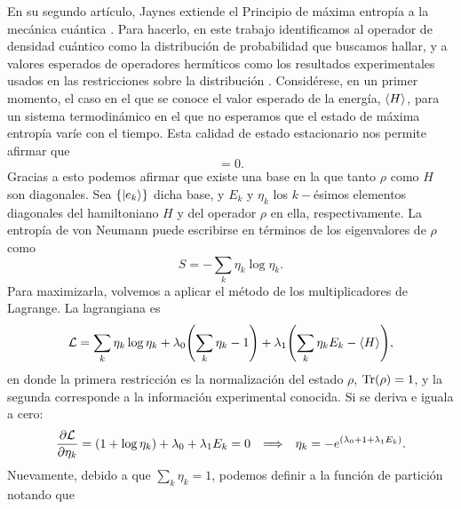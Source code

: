 En su segundo artículo, Jaynes extiende el Principio de máxima entropía a la mecánica cuántica \cite{JaynesII}. Para hacerlo, en este trabajo identificamos al operador de densidad cuántico como la distribución de probabilidad que buscamos hallar, y a valores esperados de operadores hermíticos como los resultados experimentales usados en las restricciones sobre la distribución  . Considérese, en un primer momento, el caso en el que se conoce el valor esperado de la energía, $\expval{H}$, para un sistema termodinámico en el que no esperamos que el estado de máxima entropía varíe con el tiempo. Esta calidad de estado estacionario nos permite afirmar que
\begin{equation*}
    [\rho,H]=0.
\end{equation*}
Gracias a esto podemos afirmar que existe una base en la que tanto $\rho$ como $H$ son diagonales. Sea $\{\ket{e_{k}}\}$ dicha base, y $E_{k}$ y $\eta_{k}$ los $k-$ésimos elementos diagonales del hamiltoniano $H$ y del operador $\rho$ en ella, respectivamente. La entropía de von Neumann puede escribirse en términos de los eigenvalores de $\rho$ como
\begin{equation*}
    S=-\sum_{k}\eta_{k}\log{\eta_{k}}.
\end{equation*}
Para maximizarla, volvemos a aplicar el método de los multiplicadores de Lagrange. La lagrangiana es
\begin{equation*}
    \mathcal{L}=\sum_{k}\eta_{k}\log{\eta_{k}}+\lambda_{0}\qty(\sum_{k}\eta_{k}-1)+\lambda_{1}\qty(\sum_{k}\eta_{k}E_{k}-\expval{H}),
\end{equation*}
en donde la primera restricción es la normalización del estado $\rho$, $\Tr(\rho)=1$, y la segunda corresponde a la información experimental conocida. Si se deriva e iguala a cero:
\begin{align*}
    \frac{\partial \mathcal{L}}{\partial \eta_{k}}=(1+\log{\eta_{k}})+\lambda_{0}+\lambda_{1}E_{k}=0 & & \Longrightarrow  & &\eta_{k}=-e^{(\lambda_{0}+1+\lambda_{1}E_{k})}.
\end{align*}
Nuevamente, debido a que $\sum_{k}\eta_{k}=1$, podemos definir a la función de partición notando que
